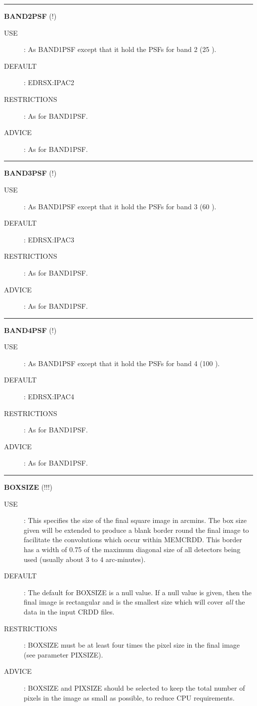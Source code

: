 \rule{\textwidth}{0.3mm}
{\Large {\bf BAND2PSF} (!)}
\begin{description}
\item [USE]:
As BAND1PSF except that it hold the PSFs for band 2 (25 \micron).
\item [DEFAULT]:
EDRSX:IPAC2
\item [RESTRICTIONS]:
As for BAND1PSF.
\item [ADVICE]:
As for BAND1PSF.
\end {description}

\rule{\textwidth}{0.3mm}
{\Large {\bf BAND3PSF} (!)}
\begin{description}
\item [USE]:
As BAND1PSF except that it hold the PSFs for band 3 (60 \micron).
\item [DEFAULT]:
EDRSX:IPAC3
\item [RESTRICTIONS]:
As for BAND1PSF.
\item [ADVICE]:
As for BAND1PSF.
\end {description}

\rule{\textwidth}{0.3mm}
{\Large {\bf BAND4PSF} (!)}
\begin{description}
\item [USE]:
As BAND1PSF except that it hold the PSFs for band 4 (100 \micron).
\item [DEFAULT]:
EDRSX:IPAC4
\item [RESTRICTIONS]:
As for BAND1PSF.
\item [ADVICE]:
As for BAND1PSF.
\end {description}


\rule{\textwidth}{0.3mm}
{\Large {\bf BOXSIZE} (!!!)}
\begin{description}
\item [USE]:
This specifies the size of the final square image in arcmins. The box size given
will be extended to produce a blank border round the final image to facilitate
the convolutions which occur within MEMCRDD. This border has a width of 0.75 of 
the maximum diagonal size of all detectors being used (usually about 3 to 4
arc-minutes).
\item [DEFAULT]:
The default for BOXSIZE is a null value. If a null value is given, then the 
final image is rectangular and is the smallest size which will cover {\em all} 
the data in the input CRDD files.
\item [RESTRICTIONS]:
BOXSIZE must be at least four times the pixel size in the final image (see 
parameter PIXSIZE).
\item [ADVICE]:
BOXSIZE and PIXSIZE should be selected to keep the total number of pixels in the 
image as small as possible, to reduce CPU requirements.
\end {description}

